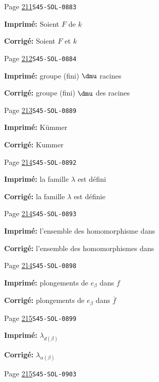\begin{description}
\smallskip
\item[\hypertarget{apparatus:FR-0217}{217}] Page \hyperlink{printpage:fr:211}{211}\quad\texttt{S45-SOL-0883}
\par\noindent\textbf{Imprimé:} Soient $F$ de $k$
\par\noindent\textbf{Corrigé:} Soient $F$ et $k$
\smallskip
\item[\hypertarget{apparatus:FR-0218}{218}] Page \hyperlink{printpage:fr:212}{212}\quad\texttt{S45-SOL-0884}
\par\noindent\textbf{Imprimé:} groupe (fini) $\dmu$ racines
\par\noindent\textbf{Corrigé:} groupe (fini) $\dmu$ des racines
\smallskip
\item[\hypertarget{apparatus:FR-0219}{219}] Page \hyperlink{printpage:fr:213}{213}\quad\texttt{S45-SOL-0889}
\par\noindent\textbf{Imprimé:} K\"ummer
\par\noindent\textbf{Corrigé:} Kummer
\smallskip
\item[\hypertarget{apparatus:FR-0220}{220}] Page \hyperlink{printpage:fr:214}{214}\quad\texttt{S45-SOL-0892}
\par\noindent\textbf{Imprimé:} la famille $\lambda$ est défini
\par\noindent\textbf{Corrigé:} la famille $\lambda$ est définie
\smallskip
\item[\hypertarget{apparatus:FR-0221}{221}] Page \hyperlink{printpage:fr:214}{214}\quad\texttt{S45-SOL-0893}
\par\noindent\textbf{Imprimé:} l'ensemble des homomorphisme dans
\par\noindent\textbf{Corrigé:} l'ensemble des homomorphismes dans
\smallskip
\item[\hypertarget{apparatus:FR-0222}{222}] Page \hyperlink{printpage:fr:214}{214}\quad\texttt{S45-SOL-0898}
\par\noindent\textbf{Imprimé:} plongements de $e_\beta$ dans $f$
\par\noindent\textbf{Corrigé:} plongements de $e_\beta$ dans $\bar f$
\smallskip
\item[\hypertarget{apparatus:FR-0223}{223}] Page \hyperlink{printpage:fr:215}{215}\quad\texttt{S45-SOL-0899}
\par\noindent\textbf{Imprimé:} \(\lambda_{d(\beta)}\)
\par\noindent\textbf{Corrigé:} \(\lambda_{\alpha(\beta)}\)
\smallskip
\item[\hypertarget{apparatus:FR-0224}{224}] Page \hyperlink{printpage:fr:215}{215}\quad\texttt{S45-SOL-0903}

\end{description}
